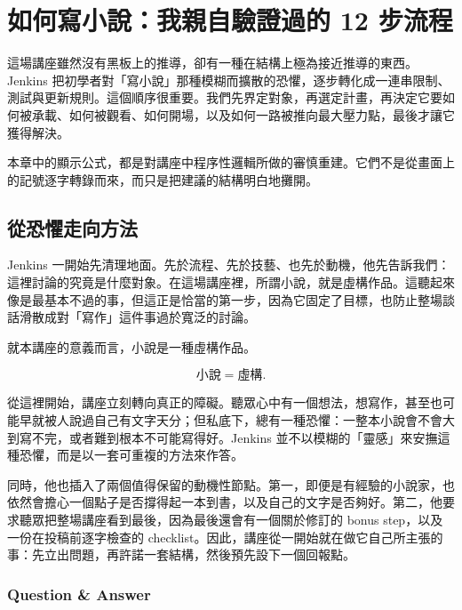 \chapter{如何寫小說：我親自驗證過的 12 步流程}

這場講座雖然沒有黑板上的推導，卻有一種在結構上極為接近推導的東西。Jenkins 把初學者對「寫小說」那種模糊而擴散的恐懼，逐步轉化成一連串限制、測試與更新規則。這個順序很重要。我們先界定對象，再選定計畫，再決定它要如何被承載、如何被觀看、如何開場，以及如何一路被推向最大壓力點，最後才讓它獲得解決。

\begin{remark}
本章中的顯示公式，都是對講座中程序性邏輯所做的審慎重建。它們不是從畫面上的記號逐字轉錄而來，而只是把建議的結構明白地攤開。
\end{remark}

\section{從恐懼走向方法}

Jenkins 一開始先清理地面。先於流程、先於技藝、也先於動機，他先告訴我們：這裡討論的究竟是什麼對象。在這場講座裡，所謂小說，就是虛構作品。這聽起來像是最基本不過的事，但這正是恰當的第一步，因為它固定了目標，也防止整場談話滑散成對「寫作」這件事過於寬泛的討論。

\begin{definition}
就本講座的意義而言，小說是一種虛構作品。
\end{definition}

\begin{equation}
\text{小說}=\text{虛構}.
\end{equation}

從這裡開始，講座立刻轉向真正的障礙。聽眾心中有一個想法，想寫作，甚至也可能早就被人說過自己有文字天分；但私底下，總有一種恐懼：一整本小說會不會大到寫不完，或者難到根本不可能寫得好。Jenkins 並不以模糊的「靈感」來安撫這種恐懼，而是以一套可重複的方法來作答。

同時，他也插入了兩個值得保留的動機性節點。第一，即便是有經驗的小說家，也依然會擔心一個點子是否撐得起一本到書，以及自己的文字是否夠好。第二，他要求聽眾把整場講座看到最後，因為最後還會有一個關於修訂的 bonus step，以及一份在投稿前逐字檢查的 checklist。因此，講座從一開始就在做它自己所主張的事：先立出問題，再許諾一套結構，然後預先設下一個回報點。

\subsection{Question \& Answer}

